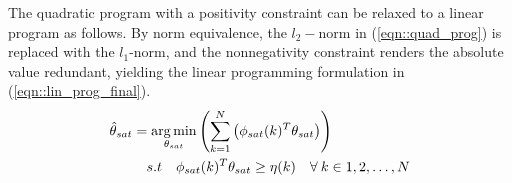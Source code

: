 The quadratic program with a positivity constraint can be relaxed to a linear program as follows. By norm equivalence,
the $l_2-$norm in (\ref{eqn::quad_prog}) is replaced with the $l_1$-norm, and the nonnegativity constraint renders the
absolute value redundant, yielding the linear programming formulation in (\ref{eqn::lin_prog_final}).
\begin{align}
        \hat \theta_{sat}
         & = \operatorname*{arg\,min}_{\theta_{sat}} \left( \sum_{k=1}^N \left( \phi_{sat}(k)^T \theta_{sat} \right) \right) \notag                \\
         & \quad  s.t \quad \phi_{sat}(k)^T \theta_{sat} \geq \eta(k) \quad \forall \: k \in {1,2, \hdots, N}
        \label{eqn::lin_prog_final}
\end{align}
